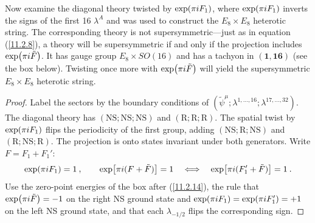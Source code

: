 Now examine the diagonal theory twisted by $\exp(\pi i F_{1})$, where $\exp(\pi i F_{1})$ inverts the signs of the first 16 $\lambda^{A}$ and was used to construct the $E_{8}\times E_{8}$ heterotic string. The corresponding theory is not supersymmetric—just as in equation (\ref{11.2.8}), a theory will be supersymmetric if and only if the projection includes $\exp(\pi i \tilde{F})$. It has gauge group $E_{8}\times SO(16)$ and has a tachyon in $(\mathbf{1},\mathbf{16})$ (see the box below). Twisting once more with $\exp(\pi i\tilde{F})$ will yield the supersymmetric $E_{8}\times E_{8}$ heterotic string.
\begin{tcolorbox}[breakable]
	\begin{proof}
		Label the sectors by the boundary conditions of $(\tilde{\psi}^{\mu};\lambda^{1,\dots,16};\lambda^{17,\dots,32})$. The diagonal theory has $(\text{NS};\text{NS};\text{NS})$ and $(\text{R};\text{R};\text{R})$. The spatial twist by $\exp(\pi i F_{1})$ flips the periodicity of the first group, adding $(\text{NS};\text{R};\text{NS})$ and $(\text{R};\text{NS};\text{R})$. The projection is onto states invariant under both generators. Write $F=F_{1}+F_{1}'$:
		\begin{equation*}
			\exp(\pi i F_{1})=1\:,\qquad \exp[\pi i(F+\tilde{F})]=1\quad\Longleftrightarrow\quad \exp[\pi i(F_{1}'+\tilde{F})]=1\:.
		\end{equation*}
		Use the zero-point energies of the box after (\ref{11.2.14}), the rule that $\exp(\pi i\tilde{F})=-1$ on the right NS ground state and $\exp(\pi i F_{1})=\exp(\pi i F_{1}')=+1$ on the left NS ground state, and that each $\lambda_{-1/2}$ flips the corresponding sign.


\end{proof}
\end{tcolorbox}
